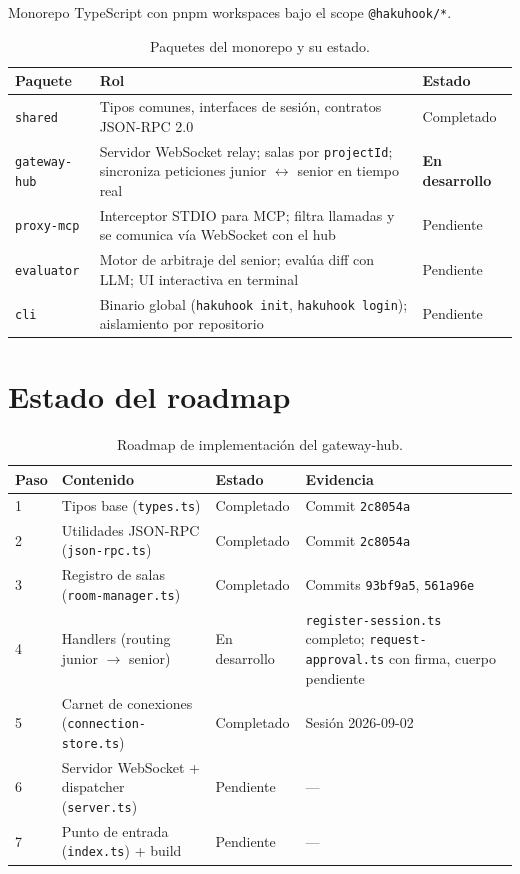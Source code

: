 \documentclass[11pt,a4paper]{article}
\begin{document}
Monorepo TypeScript con pnpm workspaces bajo el scope \texttt{@hakuhook/*}.

\begin{table}[h]
  \centering
  \begin{tabular}{@{}p{3.2cm}p{7.5cm}p{2.8cm}@{}}
    \toprule
    \textbf{Paquete} & \textbf{Rol} & \textbf{Estado} \\
    \midrule
    \texttt{shared} & Tipos comunes, interfaces de sesión,
                      contratos JSON-RPC 2.0 & Completado \\
    \texttt{gateway-hub} & Servidor WebSocket relay; salas por \texttt{projectId};
                           sincroniza peticiones junior $\leftrightarrow$ senior
                           en tiempo real & \textbf{En desarrollo} \\
    \texttt{proxy-mcp} & Interceptor STDIO para MCP; filtra llamadas y se
                         comunica vía WebSocket con el hub & Pendiente \\
    \texttt{evaluator} & Motor de arbitraje del senior; evalúa diff con LLM;
                         UI interactiva en terminal & Pendiente \\
    \texttt{cli} & Binario global (\texttt{hakuhook init}, \texttt{hakuhook login});
                   aislamiento por repositorio & Pendiente \\
    \bottomrule
  \end{tabular}
  \caption{Paquetes del monorepo y su estado.}
\end{table}

\section{Estado del roadmap}

\begin{table}[h]
  \centering
  \begin{tabular}{@{}p{1.6cm}p{5.2cm}p{3cm}p{3.4cm}@{}}
    \toprule
    \textbf{Paso} & \textbf{Contenido} & \textbf{Estado} & \textbf{Evidencia} \\
    \midrule
    1 & Tipos base (\texttt{types.ts}) & Completado & Commit \texttt{2c8054a} \\
    2 & Utilidades JSON-RPC (\texttt{json-rpc.ts}) & Completado & Commit \texttt{2c8054a} \\
    3 & Registro de salas (\texttt{room-manager.ts}) & Completado & Commits \texttt{93bf9a5}, \texttt{561a96e} \\
    4 & Handlers (routing junior $\rightarrow$ senior) & En desarrollo &
           \texttt{register-session.ts} completo; \texttt{request-approval.ts}
           con firma, cuerpo pendiente \\
    5 & Carnet de conexiones (\texttt{connection-store.ts}) & Completado & Sesión 2026-09-02 \\
    6 & Servidor WebSocket + dispatcher (\texttt{server.ts}) & Pendiente & --- \\
    7 & Punto de entrada (\texttt{index.ts}) + build & Pendiente & --- \\
    \bottomrule
  \end{tabular}
  \caption{Roadmap de implementación del gateway-hub.}
\end{table}
\end{document}
